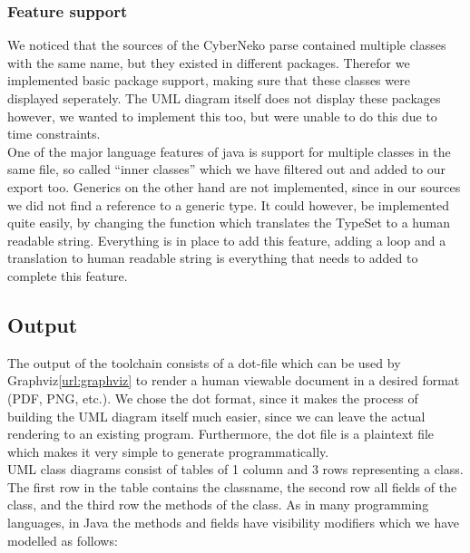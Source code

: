 \documentclass[a4paper,twoside,11pt]{article}
\begin{document}
\subsubsection{Feature support}
\label{sec:featuresupport}
We noticed that the sources of the CyberNeko parse contained multiple classes with the same name, but they existed in different packages. Therefor we implemented basic package support, making sure that these classes were displayed seperately. The UML diagram itself does not display these packages however, we wanted to implement this too, but were unable to do this due to time constraints. \\

One of the major language features of java is support for multiple classes in the same file, so called ``inner classes'' which we have filtered out and added to our export too. Generics on the other hand are not implemented, since in our sources we did not find a reference to a generic type. It could however, be implemented quite easily, by changing the function which translates the TypeSet to a human readable string. Everything is in place to add this feature,  adding a loop and a translation to human readable string is everything that needs to added to complete this feature.

\subsection{Output}
\label{sec:output}
The output of the toolchain consists of a dot-file which can be used by Graphviz\ref{url:graphviz} to render a human viewable document in a desired format (PDF, PNG, etc.). We chose the dot format, since it makes the process of building the UML diagram itself much easier, since we can leave the actual rendering to an existing program. Furthermore, the dot file is a plaintext file which makes it very simple to generate programmatically. \\

UML class diagrams consist of tables of 1 column and 3 rows representing a class. The first row in the table contains the classname, the second row all fields of the class, and the third row the methods of the class. As in many programming languages, in Java the methods and fields have visibility modifiers which we have modelled as follows:
\end{document}
